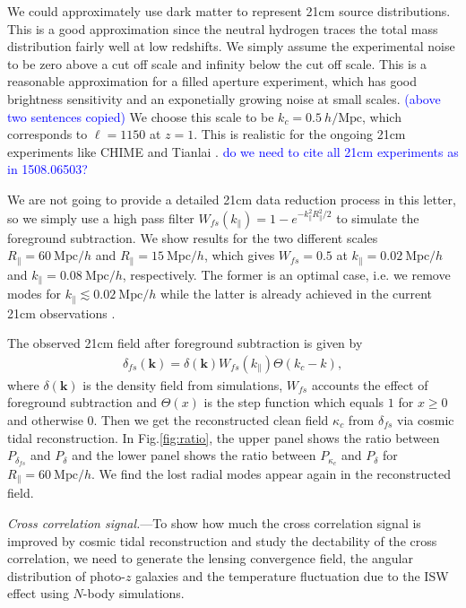 \documentclass[aps,prl,twocolumn,showpacs,superscriptaddress,groupedaddress,nofootinbib]{revtex4}  %
\newcommand{\mr}{\mathrm}
\newcommand{\tcb}{\textcolor{blue}}
\begin{document}
We could approximately use dark matter to represent 21cm source distributions.
This is a good approximation since the neutral hydrogen traces the total mass
distribution fairly well at low redshifts. We simply assume the experimental
noise to be zero above a cut off scale and infinity below the cut off scale.
This is a reasonable approximation for a filled aperture experiment, which
has good brightness sensitivity and an exponetially growing noise at small 
scales. \tcb{(above two sentences copied)}
We choose this scale to be $k_c=0.5\ h/\mr{Mpc}$, which corresponds
to $\ell=1150$ at $z=1$. This is realistic for the ongoing 21cm experiments like
CHIME \cite{2014SPIE.9145E..22B}\cite{2014SPIE.9145E..4VN}
and Tianlai \cite{2012IJMPS..12..256C}\cite{2015ApJ...798...40X}.
\tcb{do we need to cite all 21cm experiments as in 1508.06503?}

We are not going to provide a detailed 21cm data reduction process in this 
letter, so we simply  use a high pass filter 
$W_{fs}(k_\parallel)=1-e^{-k_\parallel^2R_\parallel^2/2}$ to simulate the 
foreground subtraction. We show results for the two different scales 
$R_\parallel=60\ \mr{Mpc}/h$ and $R_\parallel=15\ \mr{Mpc}/h$, which gives
$W_{fs}=0.5$ at $k_\parallel=0.02\ \mr{Mpc}/h$ and 
$k_\parallel=0.08\ \mr{Mpc}/h$, respectively. The former is an optimal case, 
i.e. we remove modes for $k_\parallel\lesssim0.02\ \mr{Mpc}/h$ while the latter
is already achieved in the current 21cm observations 
\cite{2013ApJ...763L..20M}\cite{2013MNRAS.434L..46S}.

The observed 21cm field after foreground subtraction is given by 
\begin{eqnarray}
\delta_{fs}(\bm{k})=\delta(\bm{k})W_{fs}(k_\parallel)\Theta(k_c-k),
\end{eqnarray}
where $\delta(\bm{k})$ is the density field from simulations, $W_{fs}$ accounts
the effect of foreground subtraction and $\Theta(x)$ is the step function 
which equals $1$ for $x\ge0$ and otherwise $0$.
Then we get the reconstructed clean field $\kappa_c$ from $\delta_{fs}$ via
cosmic tidal reconstruction. In Fig.\ref{fig:ratio}, the upper panel shows the 
ratio between $P_{\delta_{fs}}$ and $P_{\delta}$ and the lower panel shows the
ratio between $P_{\kappa_c}$ and $P_\delta$ for $R_\parallel=60\ \mr{Mpc}/h$. 
We find the lost radial modes appear again in the reconstructed field.

{\it Cross correlation signal.}---To show how much the cross correlation signal
is improved by cosmic tidal reconstruction and study the dectability of the
cross correlation, we need to generate the lensing convergence field,
the angular distribution of photo-$z$ galaxies and the temperature fluctuation
due to the ISW effect using $N$-body simulations.
\end{document}
